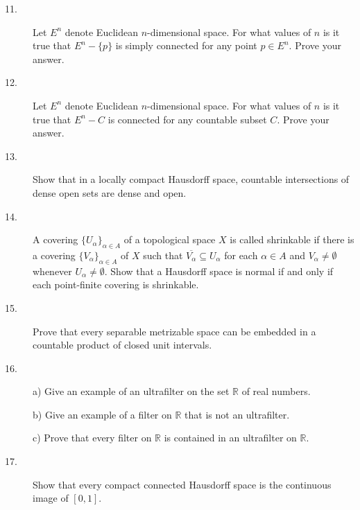 \documentclass{article}
\def\R{\mathbb R}
\begin{document}
\begin{description}
\item[11.]
Let $E^n$ denote Euclidean $n$-dimensional space. For what values of $n$ is
it true that $E^n - \{p\}$ is simply connected for any point $p \in E^n$.
Prove your answer.

\item[12.]
Let $E^n$ denote Euclidean $n$-dimensional space. For what values of $n$ is
it true that $E^n-C$ is connected for any countable subset $C$. Prove your
answer.

\item[13.]
Show that in a locally compact Hausdorff space, countable intersections of
dense open sets are dense and open.

\item[14.]
A covering $\{U_\alpha\}_{\alpha \in A}$ of a topological space $X$ is called
shrinkable if there is a covering $\{V_\alpha\}_{\alpha \in A}$ of $X$
such that $\overline{V_\alpha} \subseteq U_\alpha$ for each
$\alpha \in A$ and $V_\alpha \neq \emptyset$ whenever
$U_\alpha \neq \emptyset$. Show that a Hausdorff space is normal if and only
if each point-finite covering is shrinkable.

\item[15.]
Prove that every separable metrizable space can be embedded in a countable
product of closed unit intervals.

\item[16.]

\item[\quad] a)
Give an example of an ultrafilter on the set $\R$ of real numbers.

\item[\quad] b)
Give an example of a filter on $\R$ that is not an ultrafilter.

\item[\quad] c)
Prove that every filter on $\R$ is contained in an ultrafilter on $\R$.

\item[17.]
Show that every compact connected Hausdorff space is the continuous image of
$[0,1]$.



\end{description}    
\end{document}
